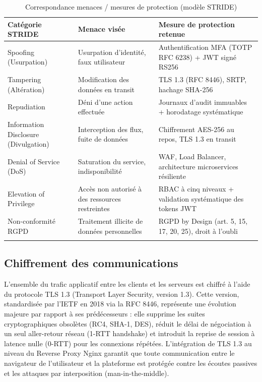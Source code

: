 \begin{longtable}{|m{3.5cm}|m{3.5cm}|m{6cm}|}
\hline
\textbf{Catégorie STRIDE} & \textbf{Menace visée} & \textbf{Mesure de protection retenue} \\
\hline
\endhead
\endfoot
\endlastfoot
\hline
Spoofing (Usurpation) & Usurpation d'identité, faux utilisateur & Authentification MFA (TOTP RFC 6238) + JWT signé RS256 \\
\hline
Tampering (Altération) & Modification des données en transit & TLS 1.3 (RFC 8446), SRTP, hachage SHA-256 \\
\hline
Repudiation & Déni d'une action effectuée & Journaux d'audit immuables + horodatage systématique \\
\hline
Information Disclosure (Divulgation) & Interception des flux, fuite de données & Chiffrement AES-256 au repos, TLS 1.3 en transit \\
\hline
Denial of Service (DoS) & Saturation du service, indisponibilité & WAF, Load Balancer, architecture microservices résiliente \\
\hline
Elevation of Privilege & Accès non autorisé à des ressources restreintes & RBAC à cinq niveaux + validation systématique des tokens JWT \\
\hline
Non-conformité RGPD & Traitement illicite de données personnelles & RGPD by Design (art. 5, 15, 17, 20, 25), droit à l'oubli \\
\hline
\captionsetup{justification=centering,margin=2cm}
\caption{Correspondance menaces / mesures de protection (modèle STRIDE)}
\label{tab:stride}
\end{longtable}

\subsection{Chiffrement des communications}
L'ensemble du trafic applicatif entre les clients et les serveurs est chiffré à l'aide du protocole TLS 1.3 (Transport Layer Security, version 1.3). Cette version, standardisée par l'IETF en 2018 via la RFC 8446, représente une évolution majeure par rapport à ses prédécesseurs : elle supprime les suites cryptographiques obsolètes (RC4, SHA-1, DES), réduit le délai de négociation à un seul aller-retour réseau (1-RTT handshake) et introduit la reprise de session à latence nulle (0-RTT) pour les connexions répétées. L'intégration de TLS 1.3 au niveau du Reverse Proxy Nginx garantit que toute communication entre le navigateur de l'utilisateur et la plateforme est protégée contre les écoutes passives et les attaques par interposition (man-in-the-middle).

